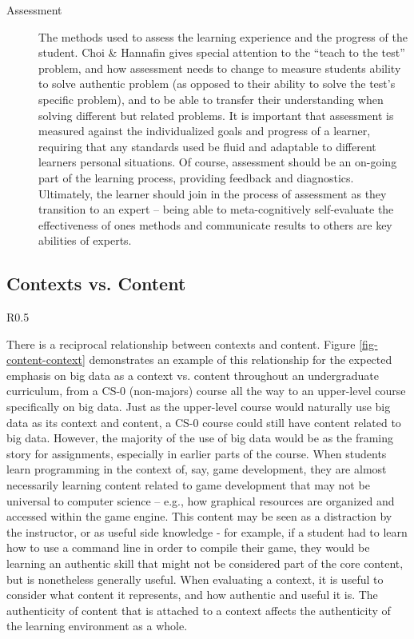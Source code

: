 \begin{description}
	\item[Assessment] The methods used to assess the learning experience and the progress of the student.
	Choi \& Hannafin gives special attention to the “teach to the test” problem, and how assessment needs to change to measure students ability to solve authentic problem (as opposed to their ability to solve the test’s specific problem), and to be able to transfer their understanding when solving different but related problems.
	It is important that assessment is measured against the individualized goals and progress of a learner, requiring that any standards used be fluid and adaptable to different learners personal situations.
	Of course, assessment should be an on-going part of the learning process, providing feedback and diagnostics.
	Ultimately, the learner should join in the process of assessment as they transition to an expert – being able to meta-cognitively self-evaluate the effectiveness of ones methods and communicate results to others are key abilities of experts. 
\end{description}

\subsection{Contexts vs. Content}

\begin{wrapfigure}{R}{0.5\textwidth}
		\begin{center}
		\end{center}
		\caption{Content vs. Context}
		\label{fig-content-context}
\end{wrapfigure}

There is a reciprocal relationship between contexts and content.
Figure \ref{fig-content-context} demonstrates an example of this relationship for the expected emphasis on big data as a context vs. content throughout an undergraduate curriculum, from a CS-0 (non-majors) course all the way to an upper-level course specifically on big data.
Just as the upper-level course would naturally use big data as its context and content, a CS-0 course could still have content related to big data.
However, the majority of the use of big data would be as the framing story for assignments, especially in earlier parts of the course.
When students learn programming in the context of, say, game development, they are almost necessarily learning content related to game development that may not be universal to computer science -- e.g., how graphical resources are organized and accessed within the game engine.
This content may be seen as a distraction by the instructor, or as useful side knowledge - for example, if a student had to learn how to use a command line in order to compile their game, they would be learning an authentic skill that might not be considered part of the core content, but is nonetheless generally useful.
When evaluating a context, it is useful to consider what content it represents, and how authentic and useful it is.
The authenticity of content that is attached to a context affects the authenticity of the learning environment as a whole.

